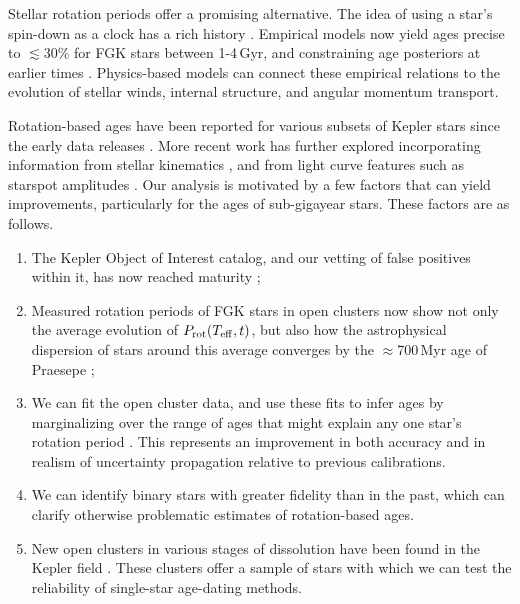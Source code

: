 \documentclass[11pt,twocolumn,tighten]{aastex63}
\begin{document}
Stellar rotation periods offer a promising alternative.  The idea of
using a star's spin-down as a clock has a rich history
\citep{Skumanich_1972,Noyes_1984,Kawaler_1989,Barnes03,Mamajek_2008,Angus_2015}.
Empirical models now yield ages precise to $\lesssim$30\% for FGK stars
between 1-4\,Gyr, and constraining age posteriors at earlier times
\citep{Bouma_2023}.  Physics-based models
\citep{Matt_2015,Gallet_Bouvier_2015,Spada_2020} can 
connect these empirical relations to the evolution of stellar winds,
internal structure, and angular momentum transport.

Rotation-based ages have been reported for
various subsets of Kepler stars since the early data releases
\citep[e.g.][]{Walkowicz_2013,McQuillan_2014,Reinhold_2015,Angus_2018}.
More recent work has further explored incorporating information from
stellar kinematics \citep{2021AJ....161..189L,2024AJ....167..159L},
and from light curve features such as starspot amplitudes
\citep{2023ApJ...952..131M}.  Our analysis is motivated by a few
factors that can yield improvements, particularly for the ages of
sub-gigayear stars.   These factors are as follows.
\begin{enumerate}[label={\it \roman*)},leftmargin=12pt,topsep=0pt,itemsep=-1ex,partopsep=1ex,parsep=1ex]
  \item The Kepler Object of Interest catalog, and our vetting of
    false positives within it, has now reached maturity
    \citep[e.g.][]{Thompson_2018};
  \item Measured rotation periods of FGK stars in open clusters now
    show not only the average evolution of $P_{\rm rot}(T_{\rm eff},t)$,
    but also how the astrophysical dispersion of stars around this average
    converges by the $\approx$700\,Myr age of Praesepe
    \citep[e.g.][]{Curtis_2019_ngc6811,Gillen_2020,Rampalli_2021,Fritzewski_2021,Rebull_2022,Dungee_2022,2023AJ....166...14B};
  \item We can fit the open cluster data, and use these fits to infer
    ages by marginalizing over the range of ages that might explain
    any one star's rotation period \citep{Bouma_2023}.
    This represents an improvement in both accuracy and in realism
    of uncertainty propagation relative to previous calibrations.
  \item We can identify binary stars with greater fidelity than
    in the past, which can clarify otherwise problematic estimates of
    rotation-based ages.
  \item New open clusters in various stages of dissolution have been
    found in the Kepler field
    \cite[e.g.][]{2019AJ....158..122K,Bouma_2022b,Barber_2022}.
    These clusters offer a sample of stars with which we can test the
    reliability of single-star age-dating methods.
\end{enumerate}
\end{document}
